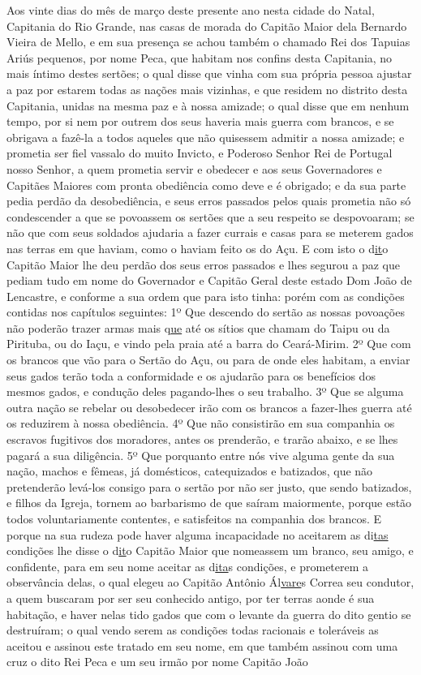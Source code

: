\begin{refsection}
    Aos vinte dias do mês de março deste presente ano nesta cidade do Natal, Capitania do Rio Grande, nas casas de morada do Capitão Maior dela Bernardo Vieira de Mello, e em sua presença se achou também o chamado Rei dos Tapuias Ariús pequenos, por nome Peca, que habitam nos confins desta Capitania, no mais íntimo destes sertões; o qual disse que vinha com sua própria pessoa ajustar a paz por estarem todas as nações mais vizinhas, e que residem no distrito desta Capitania, unidas na mesma paz e à nossa amizade; o qual disse que em nenhum tempo, por si nem por outrem dos seus haveria mais guerra com brancos, e se obrigava a fazê-la a todos aqueles que não quisessem admitir a nossa amizade; e prometia ser fiel vassalo do muito Invicto, e Poderoso Senhor Rei de Portugal nosso Senhor, a quem prometia servir e obedecer e aos seus Governadores e Capitães Maiores com pronta obediência como deve e é obrigado; e da sua parte pedia perdão da desobediência, e seus erros passados pelos quais prometia não só condescender a que se povoassem os sertões que a seu respeito se despovoaram; se não que com seus soldados ajudaria a fazer currais e casas para se meterem gados nas terras em que haviam, como o haviam feito os do Açu. E com isto o d\underline{it}o Capitão Maior lhe deu perdão dos seus erros passados e lhes segurou a paz que pediam tudo em nome do Governador e Capitão Geral deste estado Dom João de Lencastre, e conforme a sua ordem que para isto tinha: porém com as condições contidas nos capítulos seguintes: 1º Que descendo do sertão as nossas povoações não poderão trazer armas mais q\underline{ue} até os sítios que chamam do Taipu ou da Pirituba, ou do Iaçu, e vindo pela praia até a barra do Ceará-Mirim. 2º Que com os brancos que vão para o Sertão do Açu, ou para de onde eles habitam, a enviar seus gados terão toda a conformidade e os ajudarão para os benefícios dos mesmos gados, e condução deles pagando-lhes o seu trabalho. 3º Que se alguma outra nação se rebelar ou desobedecer irão com os brancos a fazer-lhes guerra até os reduzirem à nossa obediência. 4º Que não consistirão em sua companhia os escravos fugitivos dos moradores, antes os prenderão, e trarão abaixo, e se lhes pagará a sua diligência. 5º Que porquanto entre nós vive alguma gente da sua nação, machos e fêmeas, já domésticos, catequizados e batizados, que não pretenderão levá-los consigo para o sertão por não ser justo, que sendo batizados, e filhos da Igreja, tornem ao barbarismo de que saíram maiormente, porque estão todos voluntariamente contentes, e satisfeitos na companhia dos brancos. E porque na sua rudeza pode haver alguma incapacidade no aceitarem as di\underline{tas} condições lhe disse o d\underline{it}o Capitão Maior que nomeassem um branco, seu amigo, e confidente, para em seu nome aceitar as d\underline{ita}s condições, e prometerem a observância delas, o qual elegeu ao Capitão Antônio Ál\underline{vare}s Correa seu condutor, a quem buscaram por ser seu conhecido antigo, por ter terras aonde é sua habitação, e haver nelas tido gados que com o levante da guerra do dito gentio se destruíram; o qual vendo serem as condições todas racionais e toleráveis as aceitou e assinou este tratado em seu nome, em que também assinou com uma cruz o dito Rei Peca e um seu irmão por nome Capitão João 
\end{refsection}
